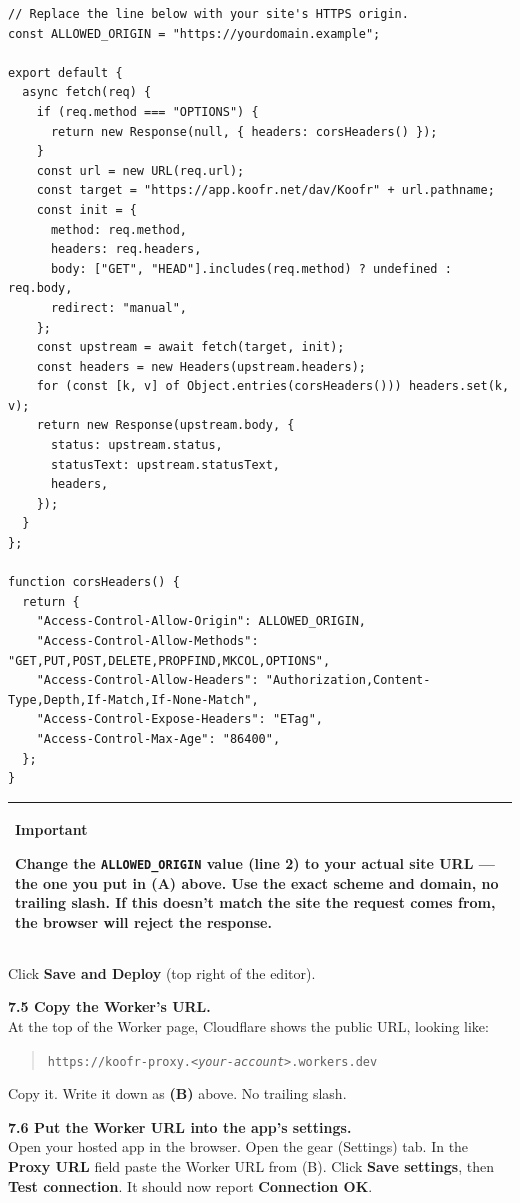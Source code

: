 \documentclass[11pt,a4paper]{article}
\newcommand{\callout}[3]{%
  \begin{center}%
  \begin{tabularx}{\linewidth}{|>{\columncolor{#1}}X|}%
  \hline
  \textbf{#2}\par\smallskip #3\\[2pt]
  \hline
  \end{tabularx}%
  \end{center}%
}
\newcommand{\warnbox}[1]{\callout{warnbg}{Important}{#1}}
\begin{document}
\begin{lstlisting}[language=shell]
// Replace the line below with your site's HTTPS origin.
const ALLOWED_ORIGIN = "https://yourdomain.example";

export default {
  async fetch(req) {
    if (req.method === "OPTIONS") {
      return new Response(null, { headers: corsHeaders() });
    }
    const url = new URL(req.url);
    const target = "https://app.koofr.net/dav/Koofr" + url.pathname;
    const init = {
      method: req.method,
      headers: req.headers,
      body: ["GET", "HEAD"].includes(req.method) ? undefined : req.body,
      redirect: "manual",
    };
    const upstream = await fetch(target, init);
    const headers = new Headers(upstream.headers);
    for (const [k, v] of Object.entries(corsHeaders())) headers.set(k, v);
    return new Response(upstream.body, {
      status: upstream.status,
      statusText: upstream.statusText,
      headers,
    });
  }
};

function corsHeaders() {
  return {
    "Access-Control-Allow-Origin": ALLOWED_ORIGIN,
    "Access-Control-Allow-Methods": "GET,PUT,POST,DELETE,PROPFIND,MKCOL,OPTIONS",
    "Access-Control-Allow-Headers": "Authorization,Content-Type,Depth,If-Match,If-None-Match",
    "Access-Control-Expose-Headers": "ETag",
    "Access-Control-Max-Age": "86400",
  };
}
\end{lstlisting}

\warnbox{Change the \texttt{ALLOWED\_ORIGIN} value (line 2) to your actual site URL --- the one you put in (A) above. Use the exact scheme and domain, no trailing slash. If this doesn't match the site the request comes from, the browser will reject the response.}

Click \textbf{Save and Deploy} (top right of the editor).

\textbf{7.5 Copy the Worker's URL.}\\
At the top of the Worker page, Cloudflare shows the public URL, looking like:
\begin{quote}\texttt{https://koofr-proxy.\textit{\color{red!70!black}<your-account>}.workers.dev}\end{quote}
Copy it. Write it down as \textbf{(B)} above. No trailing slash.

\textbf{7.6 Put the Worker URL into the app's settings.}\\
Open your hosted app in the browser. Open the gear (Settings) tab. In the \textbf{Proxy URL} field paste the Worker URL from (B). Click \textbf{Save settings}, then \textbf{Test connection}. It should now report \textbf{Connection OK}.
\end{document}
